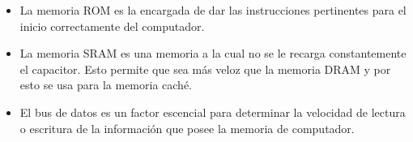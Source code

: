 \documentclass{article}
\begin{document}
\begin{itemize}
        \item
            La memoria ROM es la encargada de dar las instrucciones pertinentes para el inicio correctamente del computador.
            
            
        \item
            La memoria SRAM es una memoria a la cual no se le recarga constantemente el capacitor. Esto permite que sea más veloz que la memoria DRAM y por esto se usa para la memoria caché.    
        
        
        \item
            El bus de datos es un factor escencial para determinar la velocidad de lectura o escritura de la información que posee la memoria de computador.
            

            
    \end{itemize}







\cite{referencia}
\end{document}
